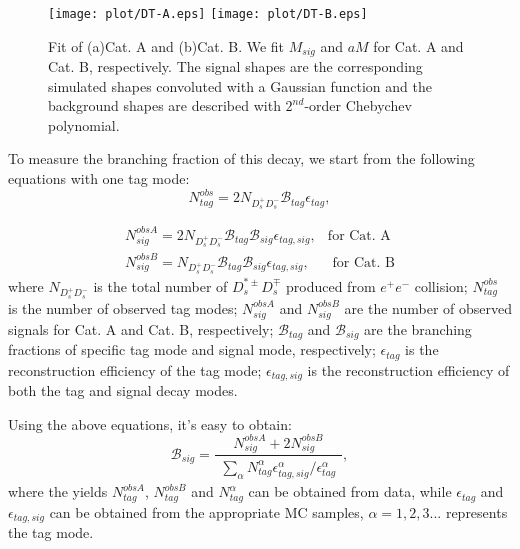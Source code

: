 {    \begin{figure*}[!htbp]
        \centering
        \texttt{[image: plot/DT-A.eps]}
        \texttt{[image: plot/DT-B.eps]}
        \caption{Fit of (a)Cat. A and (b)Cat. B.
            We fit $M_{sig}$ and $aM$ for Cat. A and Cat. B, respectively. The signal shapes are the corresponding simulated shapes convoluted with a Gaussian function and 
        the background shapes are described with $2^{nd}$-order Chebychev polynomial.}
        \label{DT-fit}
    \end{figure*}

    To measure the branching fraction of this decay, we start from the following equations with one tag mode:
    \begin{equation}
        N_{tag}^{obs} = 2N_{D_{s}^{+}D_{s}^{-}}\mathcal{B}_{tag}\epsilon_{tag}, \label{eq-ST}
    \end{equation}

    \begin{equation}
        \begin{array}{lr}
            N_{sig}^{obsA}=2N_{D_{s}^{+}D_{s}^{-}}\mathcal{B}_{tag}\mathcal{B}_{sig}\epsilon_{tag,sig}  , &\text{for Cat. A} \\
            N_{sig}^{obsB}=N_{D_{s}^{+}D_{s}^{-}}\mathcal{B}_{tag}\mathcal{B}_{sig}\epsilon_{tag,sig}  ,  &\text{  for Cat. B}  
        \end{array}
        \label{eq-DT}
    \end{equation}
    where $N_{D_{s}^{+}D_{s}^{-}}$ is the total number of $D_{s}^{*\pm}D_{s}^{\mp}$ produced from $e^{+}e^{-}$ collision; $N_{tag}^{obs}$ is the number of observed tag modes; $N_{sig}^{obsA}$ and $N_{sig}^{obsB}$ are the number of observed signals for Cat. A and Cat. B, respectively; $\mathcal{B}_{tag}$ and $\mathcal{B}_{sig}$ are the branching fractions of specific tag mode and signal mode, respectively; $\epsilon_{tag}$ is the reconstruction efficiency of the tag mode; $\epsilon_{tag,sig}$ is the reconstruction efficiency of both the tag and signal decay modes.

    Using the above equations, it's easy to obtain:
    \begin{equation}
    \mathcal{B}_{sig} = \frac{N_{sig}^{obsA}+2N_{sig}^{obsB}}{\begin{matrix}\sum_{\alpha} N_{tag}^{\alpha}\epsilon_{tag,sig}^{\alpha}/\epsilon_{tag}^{\alpha}\end{matrix}}, \label{BR-formula}
    \end{equation}
    where the yields $N_{tag}^{obsA}$, $N_{tag}^{obsB}$ and $N_{tag}^{\alpha}$ can be obtained from data, while $\epsilon_{tag}$ and $\epsilon_{tag,sig}$ can be obtained from the appropriate MC samples, $\alpha=1, 2, 3...$ represents the tag mode.
    

}
